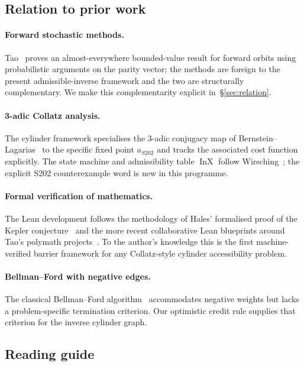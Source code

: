\documentclass[11pt,a4paper]{article}
\theoremstyle{plain}
\theoremstyle{definition}
\newcommand{\aS}{a_{S202}}
\DeclareMathOperator{\InX}{InX}
\begin{document}
\subsection{Relation to prior work}

\paragraph{Forward stochastic methods.}
Tao~\cite{tao2022} proves an almost-everywhere bounded-value result
for forward orbits using probabilistic arguments on the parity
vector; the methods are foreign to the present admissible-inverse
framework and the two are structurally complementary. We make this
complementarity explicit in~\S\ref{sec:relation}.

\paragraph{3-adic Collatz analysis.}
The cylinder framework specialises the 3-adic conjugacy map of
Bernstein--Lagarias~\cite{bernstein-lagarias} to the specific fixed
point $\aS$ and tracks the associated cost function explicitly.
The state machine and admissibility table $\InX$ follow
Wirsching~\cite{wirsching}; the explicit S202 counterexample word is
new in this programme.

\paragraph{Formal verification of mathematics.}
The Lean development follows the methodology of Hales' formalised
proof of the Kepler conjecture~\cite{flyspeck} and the more recent
collaborative Lean blueprints around Tao's polymath
projects~\cite{tao-blueprint}. To the author's knowledge this is the
first machine-verified barrier framework for any Collatz-style
cylinder accessibility problem.

\paragraph{Bellman--Ford with negative edges.}
The classical Bellman--Ford algorithm~\cite{cormen} accommodates
negative weights but lacks a problem-specific termination criterion.
Our optimistic credit rule supplies that criterion for the inverse
cylinder graph.

\subsection{Reading guide}
\end{document}
